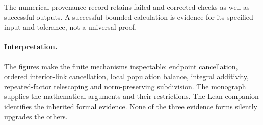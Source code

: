 The numerical provenance record retains failed and corrected checks as well as successful outputs. A successful bounded calculation is evidence for its specified input and tolerance, not a universal proof.

\paragraph{Interpretation.}
The figures make the finite mechanisms inspectable: endpoint cancellation, ordered interior-link cancellation, local population balance, integral additivity, repeated-factor telescoping and norm-preserving subdivision. The monograph supplies the mathematical arguments and their restrictions. The Lean companion identifies the inherited formal evidence. None of the three evidence forms silently upgrades the others.

\endgroup
